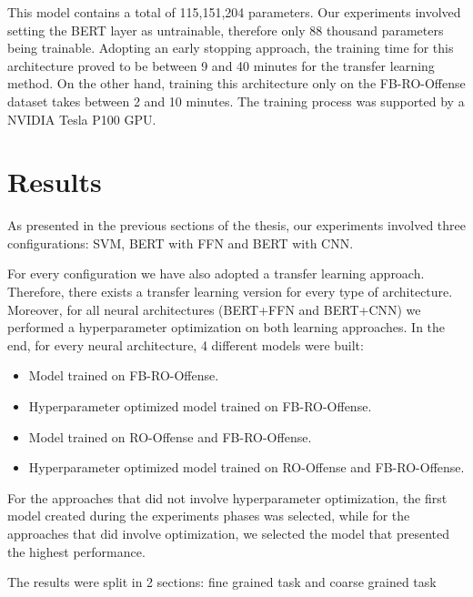 \documentclass[12pt,a4paper]{report}
\begin{document}
This model contains a total of 115,151,204 parameters. Our experiments involved setting the BERT layer as untrainable, therefore only 88 thousand parameters being trainable. Adopting an early stopping approach, the training time for this architecture proved to be between 9 and 40 minutes for the transfer learning method. On the other hand, training this architecture only on the FB-RO-Offense dataset takes between 2 and 10 minutes. The training process was supported by a NVIDIA Tesla P100 GPU.


\chapter{Results}
\label{chap:Results}
As presented in the previous sections of the thesis, our experiments involved three configurations: SVM, BERT with FFN and BERT with CNN.

For every configuration we have also adopted a transfer learning approach. Therefore, there exists a transfer learning version for every type of architecture. Moreover, for all neural architectures (BERT+FFN and BERT+CNN) we performed a hyperparameter optimization on both learning approaches. In the end, for every neural architecture, 4 different models were built:
\begin{itemize}
    \item Model trained on FB-RO-Offense.
    \item Hyperparameter optimized model trained on FB-RO-Offense.
    \item Model trained on RO-Offense and FB-RO-Offense.
    \item Hyperparameter optimized model trained on RO-Offense and FB-RO-Offense.
\end{itemize}

For the approaches that did not involve hyperparameter optimization, the first model created during the experiments phases was selected, while for the approaches that did involve optimization, we selected the model that presented the highest performance.

The results were split in 2 sections: fine grained task and coarse grained task
\end{document}
